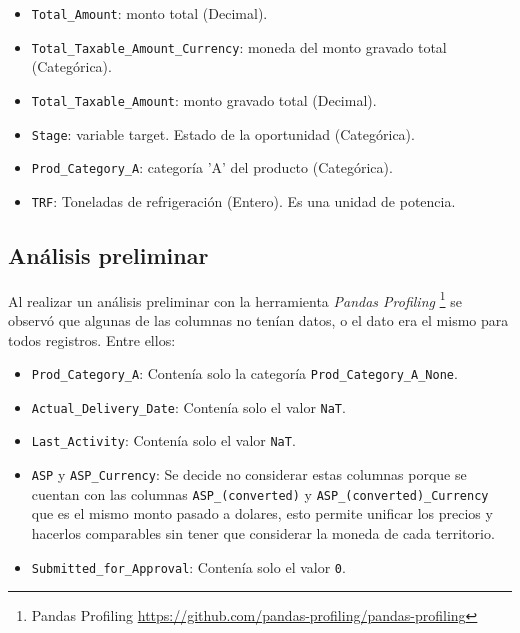 \documentclass[titlepage,a4paper]{article}
\begin{document}
\begin{itemize}
    \item \verb|Total_Amount|: monto total (Decimal).

    \item \verb|Total_Taxable_Amount_Currency|: moneda del monto gravado total (Categórica).

    \item \verb|Total_Taxable_Amount|: monto gravado total (Decimal).

    \item \verb|Stage|: variable target. Estado de la oportunidad (Categórica).

    \item \verb|Prod_Category_A|: categoría 'A' del producto (Categórica).

    \item \verb|TRF|: Toneladas de refrigeración (Entero). Es una unidad de potencia.
\end{itemize}

\subsection{Análisis preliminar}
Al realizar un análisis preliminar con la herramienta \textit{Pandas Profiling} \footnote{Pandas Profiling \href{https://github.com/pandas-profiling/pandas-profiling}{https://github.com/pandas-profiling/pandas-profiling}} se observó que algunas de las columnas no tenían datos, o el dato era el mismo para todos registros.
Entre ellos:
\begin{itemize}
    \item \verb|Prod_Category_A|: Contenía solo la categoría \verb|Prod_Category_A_None|.
    \item \verb|Actual_Delivery_Date|: Contenía solo el valor \verb|NaT|.
    \item \verb|Last_Activity|: Contenía solo el valor \verb|NaT|.
    \item \verb|ASP| y \verb|ASP_Currency|: Se decide no considerar estas columnas porque se cuentan con las columnas \verb|ASP_(converted)| y \verb|ASP_(converted)_Currency| que es el mismo monto pasado a dolares, esto permite unificar los precios y hacerlos comparables sin tener que considerar la moneda de cada territorio.
    \item \verb|Submitted_for_Approval|: Contenía solo el valor \verb|0|.
\end{itemize}

\end{document}
